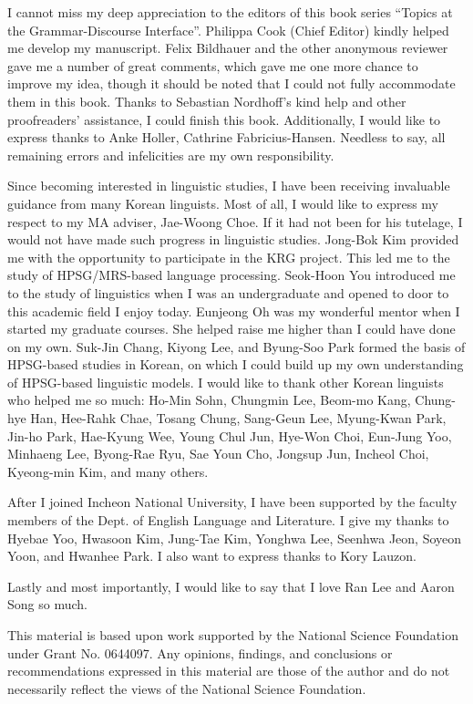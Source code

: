 \begin{refsection}
I cannot miss my deep appreciation to the editors of this book series
``Topics at the Grammar-Discourse Interface''. Philippa Cook (Chief
Editor) kindly helped me develop my manuscript.  Felix Bildhauer and
the other anonymous reviewer gave me a number of great comments, which
gave me one more chance to improve my idea, though it should be noted
that I could not fully accommodate them in this book.  Thanks to
Sebastian Nordhoff's kind help and other proofreaders' assistance, I
could finish this book.  Additionally, I would like to express thanks
to Anke Holler, Cathrine Fabricius-Hansen. Needless to say, all
remaining errors and infelicities are my own responsibility.



Since becoming interested in linguistic studies, I have been receiving
invaluable guidance from many Korean linguists. Most of all, I would
like to express my respect to my MA adviser, Jae-Woong Choe. If it had
not been for his tutelage, I would not have made such progress in
linguistic studies. Jong-Bok Kim provided me with the opportunity to
participate in the KRG project. This led me to the study of
HPSG/MRS-based language processing. Seok-Hoon You introduced me to the
study of linguistics when I was an undergraduate and opened to door to
this academic field I enjoy today. Eunjeong Oh was my wonderful mentor
when I started my graduate courses. She helped raise me higher than I
could have done on my own. Suk-Jin Chang, Kiyong Lee, and Byung-Soo
Park formed the basis of HPSG-based studies in Korean, on which I
could build up my own understanding of HPSG-based linguistic models. I
would like to thank other Korean linguists who helped me so much:
Ho-Min Sohn, Chungmin Lee, Beom-mo Kang, Chung-hye Han, Hee-Rahk Chae,
Tosang Chung, Sang-Geun Lee, Myung-Kwan Park, Jin-ho Park, Hae-Kyung
Wee, Young Chul Jun, Hye-Won Choi, Eun-Jung Yoo, Minhaeng Lee,
Byong-Rae Ryu, Sae Youn Cho, Jongsup Jun, Incheol Choi, Kyeong-min
Kim, and many others.



After I joined Incheon National University, I have been supported by
the faculty members of the Dept. of English Language and Literature. I
give my thanks to Hyebae Yoo, Hwasoon Kim, Jung-Tae Kim, Yonghwa Lee,
Seenhwa Jeon, Soyeon Yoon, and Hwanhee Park. I also want to express
thanks to Kory Lauzon.




Lastly and most importantly, I would like to say that I love Ran Lee
and Aaron Song so much.


This material is based upon work supported by the National Science
Foundation under Grant No. 0644097. Any opinions, findings, and
conclusions or recommendations expressed in this material are those of
the author and do not necessarily reflect the views of the National
Science Foundation.



\printbibliography[heading=subbibliography]
\end{refsection}


